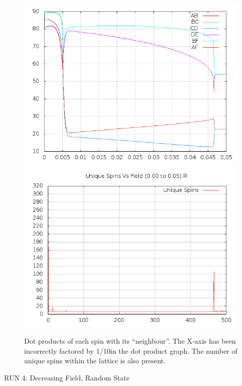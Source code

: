 \documentclass{article}
\begin{document}
\begin{center}
\begin{figure}
\centering
\includegraphics[scale=0.5]{000to005Rdots.png}
\includegraphics[scale=0.5]{000to005RFreq.png}
\caption{Dot products of each spin with its ``neighbour''. The X-axis has been incorrectly factored
by 1/10in the dot product graph. The number of unique spins within the lattice is also present.}
\end{figure}
\end{center}
\pagebreak

\thispagestyle{plain}
\begin{center}
\LARGE
RUN 4: Decreasing Field, Random State
\end{center}
\end{document}

